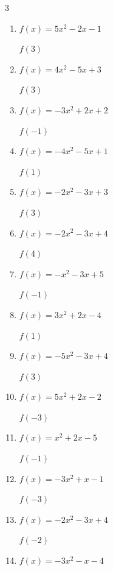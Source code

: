 \begin{multicols}{3}
\begin{enumerate}
$f(2)$
        \phantom{$= 5$}

  \item $f(x)=5x^{2}-2x-1$

$f(3)$
        \phantom{$= 38$}

  \item $f(x)=4x^{2}-5x+3$

$f(3)$
        \phantom{$= 24$}

  \item $f(x)=-3x^{2}+2x+2$

$f(-1)$
        \phantom{$= -3$}

  \item $f(x)=-4x^{2}-5x+1$

$f(1)$
        \phantom{$= -8$}

  \item $f(x)=-2x^{2}-3x+3$

$f(3)$
        \phantom{$= -24$}

  \item $f(x)=-2x^{2}-3x+4$

$f(4)$
        \phantom{$= -40$}

  \item $f(x)=-x^{2}-3x+5$

$f(-1)$
        \phantom{$= 7$}

  \item $f(x)=3x^{2}+2x-4$

$f(1)$
        \phantom{$= 1$}

  \item $f(x)=-5x^{2}-3x+4$

$f(3)$
        \phantom{$= -50$}

\columnbreak %

  \item $f(x)=5x^{2}+2x-2$

$f(-3)$
        \phantom{$= 37$}

  \item $f(x)=x^{2}+2x-5$

$f(-1)$
        \phantom{$= -6$}

  \item $f(x)=-3x^{2}+x-1$

$f(-3)$
        \phantom{$= -31$}

  \item $f(x)=-2x^{2}-3x+4$

$f(-2)$
        \phantom{$= 2$}

  \item $f(x)=-3x^{2}-x-4$


\end{enumerate}
\end{multicols}
